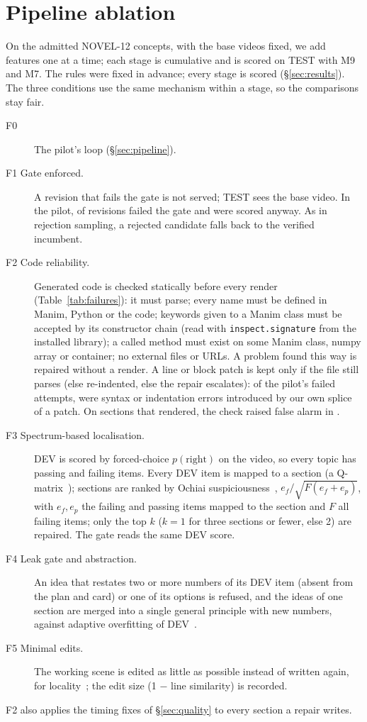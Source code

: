 \section{Pipeline ablation}\label{sec:ablation}

On the admitted NOVEL-12 concepts, with the base videos fixed, we add features one at a time; each stage is cumulative
and is scored on TEST with M9 and M7. The rules were fixed in advance; every stage is scored (\S\ref{sec:results}). The three conditions use the same mechanism within a stage, so the
comparisons stay fair.

\begin{description}
  \item[F0] The pilot's loop (\S\ref{sec:pipeline}).
  \item[F1 Gate enforced.] A revision that fails the gate is not served; TEST sees the base video. In the pilot, \PilotNotKept{} of
  \PilotRevisions{} revisions failed the gate and were scored anyway. As in rejection sampling, a rejected candidate falls back to the
  verified incumbent.
  \item[F2 Code reliability.] Generated code is checked statically before every render (Table~\ref{tab:failures}):
  it must parse; every name must be defined in Manim, Python or the code; keywords given to a Manim class must be
  accepted by its constructor chain (read with \texttt{inspect.signature} from the installed library); a called
  method must exist on some Manim class, numpy array or container; no external files or URLs. A problem found
  this way is repaired without a render. A line or block patch is kept only if the file still parses (else
  re-indented, else the repair escalates): of the pilot's \FailedAttempts{} failed attempts, \SyntaxAfterPatch{} were
  syntax or indentation errors introduced by our own splice of a patch. On sections that rendered, the check raised \PreflightFP{} false alarm in
  \PreflightN.
  \item[F3 Spectrum-based localisation.] DEV is scored by forced-choice $p(\text{right})$ on the video, so every topic
  has passing and failing items. Every DEV item is mapped to a section (a Q-matrix~\cite{tatsuoka1983}); sections are
  ranked by Ochiai suspiciousness~\cite{ochiai}, $e_f / \sqrt{F (e_f + e_p)}$, with $e_f, e_p$ the failing and passing
  items mapped to the section and $F$ all failing items; only the top $k$ ($k = 1$ for three sections or fewer, else 2)
  are repaired. The gate reads the same DEV score.
  \item[F4 Leak gate and abstraction.] An idea that restates two or more numbers of its DEV item (absent from the plan
  and card) or one of its options is refused, and the ideas of one section are merged into a single general principle
  with new numbers, against adaptive overfitting of DEV~\cite{dwork2015}.
  \item[F5 Minimal edits.] The working scene is edited as little as possible instead of written again, for
  locality~\cite{rome}; the edit size (1 $-$ line similarity) is recorded.
\end{description}
F2 also applies the timing fixes of \S\ref{sec:quality} to every section a repair writes.

